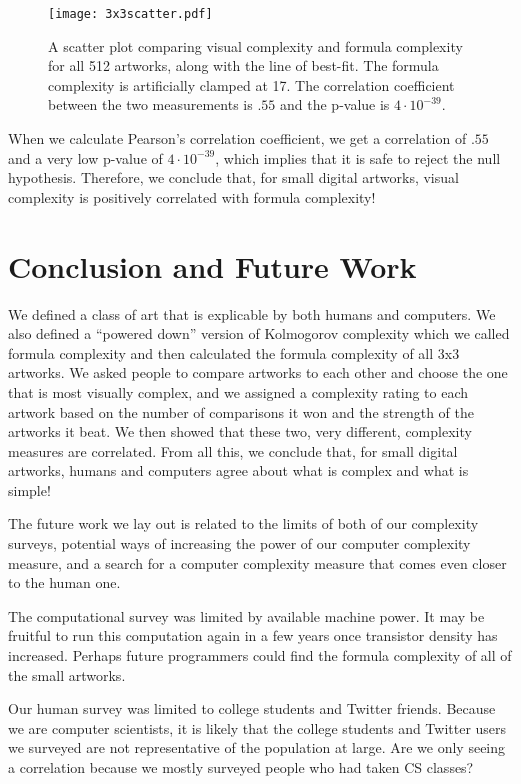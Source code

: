 \documentclass[11pt]{article}
\begin{document}
\begin{figure}
\begin{center}
\texttt{[image: 3x3scatter.pdf]}
\end{center}
\caption{A scatter plot comparing visual complexity and formula complexity for
all 512 artworks, along with the line of best-fit.  The formula complexity is
artificially clamped at 17.  The correlation coefficient between the two
measurements is $.55$ and the p-value is $4\cdot10^{-39}$.} 
\label{fig:scatter}
\end{figure}

When we calculate Pearson's correlation coefficient, we get a correlation of
$.55$ and a very low p-value of $4\cdot10^{-39}$, which implies that it is safe
to reject the null hypothesis.  Therefore, we conclude that, for small digital
artworks, visual complexity is positively correlated with formula complexity!  

\section*{Conclusion and Future Work}

We defined a class of art that is explicable by both humans and computers.  We
also defined a ``powered down'' version of Kolmogorov complexity which we
called formula complexity and then calculated the formula complexity of all 3x3
artworks.  We asked people to compare artworks to each other and choose the one
that is most visually complex, and we assigned a complexity rating to each
artwork based on the number of comparisons it won and the strength of the
artworks it beat.  We then showed that these two, very different, complexity
measures are correlated.  From all this, we conclude that, for small digital
artworks, humans and computers agree about what is complex and what is simple!

The future work we lay out is related to the limits of both of our complexity
surveys, potential ways of increasing the power of our computer complexity
measure, and a search for a computer complexity measure that comes even closer
to the human one.

The computational survey was limited by available machine power.
It may be fruitful to run this computation again in a few years once transistor
density has increased.  Perhaps future programmers could find the formula
complexity of all of the small artworks.

Our human survey was limited to college students and Twitter friends.  Because
we are computer scientists, it is likely that the college students and
Twitter users we surveyed are not representative of the population at large.
Are we only seeing a correlation because we mostly surveyed people who had
taken CS classes? 
\end{document}
